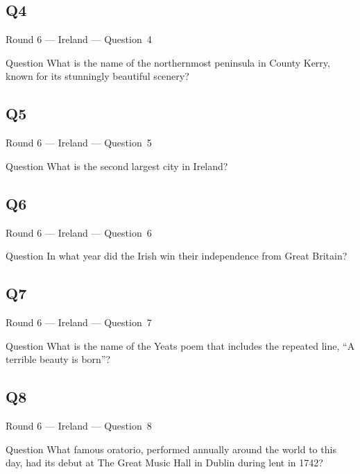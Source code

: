 \documentclass[11pt]{beamer}
\begin{document}
\subsection*{Q4}
\begin{frame}[t]{Round 6 --- Ireland --- \mbox{Question 4}}
\vspace{-0.5em}
\begin{block}{Question}
What is the name of the northernmost peninsula in County Kerry, known for its stunningly beautiful scenery?
\end{block}
\end{frame}
\subsection*{Q5}
\begin{frame}[t]{Round 6 --- Ireland --- \mbox{Question 5}}
\vspace{-0.5em}
\begin{block}{Question}
What is the second largest city in Ireland?
\end{block}
\end{frame}
\subsection*{Q6}
\begin{frame}[t]{Round 6 --- Ireland --- \mbox{Question 6}}
\vspace{-0.5em}
\begin{block}{Question}
In what year did the Irish win their independence from Great Britain?
\end{block}
\end{frame}
\subsection*{Q7}
\begin{frame}[t]{Round 6 --- Ireland --- \mbox{Question 7}}
\vspace{-0.5em}
\begin{block}{Question}
What  is the name of the Yeats poem that includes the repeated line, ``A terrible beauty is born''?
\end{block}
\end{frame}
\subsection*{Q8}
\begin{frame}[t]{Round 6 --- Ireland --- \mbox{Question 8}}
\vspace{-0.5em}
\begin{block}{Question}
What famous oratorio, performed annually around the world to this day, had its debut at The Great Music Hall in Dublin during lent in 1742? 
\end{block}
\end{frame}
\end{document}
